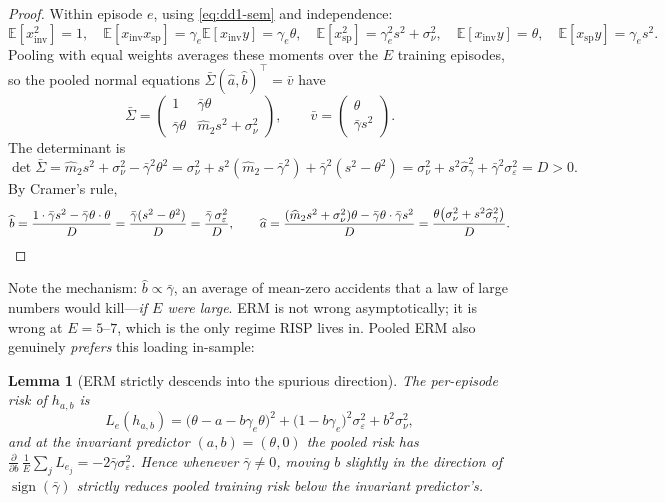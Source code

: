 \documentclass[11pt,a4paper]{article}
\theoremstyle{definition}
\theoremstyle{plain}
\newtheorem{lemma}{Lemma}[section]
\newcommand{\E}{\mathbb{E}}
\newcommand{\nm}{\textsc{RISP}}
\begin{document}
\begin{proof}
Within episode $e$, using \eqref{eq:dd1-sem} and independence:
\[
\E[x_{\mathrm{inv}}^2] = 1, \quad
\E[x_{\mathrm{inv}} x_{\mathrm{sp}}] = \gamma_e \E[x_{\mathrm{inv}} y]
= \gamma_e \theta, \quad
\E[x_{\mathrm{sp}}^2] = \gamma_e^2 s^2 + \sigma_\nu^2, \quad
\E[x_{\mathrm{inv}} y] = \theta, \quad
\E[x_{\mathrm{sp}} y] = \gamma_e s^2 .
\]
Pooling with equal weights averages these moments over the $E$ training
episodes, so the pooled normal equations
$\bar{\Sigma} (\widehat a, \widehat b)^\top = \bar v$ have
\[
\bar{\Sigma} = \begin{pmatrix} 1 & \bar{\gamma}\theta \\
\bar{\gamma}\theta & \widehat{m}_2 s^2 + \sigma_\nu^2 \end{pmatrix},
\qquad
\bar v = \begin{pmatrix} \theta \\ \bar{\gamma} s^2 \end{pmatrix}.
\]
The determinant is
\[
\det \bar{\Sigma}
= \widehat{m}_2 s^2 + \sigma_\nu^2 - \bar{\gamma}^2 \theta^2
= \sigma_\nu^2 + s^2(\widehat{m}_2 - \bar{\gamma}^2)
+ \bar{\gamma}^2 (s^2 - \theta^2)
= \sigma_\nu^2 + s^2 \widehat{\sigma}_\gamma^2
+ \bar{\gamma}^2 \sigma_\varepsilon^2 = D > 0 .
\]
By Cramer's rule,
\[
\widehat{b} = \frac{1 \cdot \bar{\gamma} s^2 - \bar{\gamma}\theta \cdot
\theta}{D} = \frac{\bar{\gamma}(s^2 - \theta^2)}{D}
= \frac{\bar{\gamma}\, \sigma_\varepsilon^2}{D},
\qquad
\widehat{a} = \frac{(\widehat{m}_2 s^2 + \sigma_\nu^2)\theta -
\bar{\gamma}\theta \cdot \bar{\gamma} s^2}{D}
= \frac{\theta\bigl( \sigma_\nu^2 + s^2 \widehat{\sigma}_\gamma^2
\bigr)}{D}. \qedhere
\]
\end{proof}

Note the mechanism: $\widehat{b} \propto \bar{\gamma}$, an average of
mean-zero accidents that a law of large numbers would kill---\emph{if $E$
were large}. ERM is not wrong asymptotically; it is wrong at $E = 5$--$7$,
which is the only regime \nm{} lives in. Pooled ERM also genuinely
\emph{prefers} this loading in-sample:

\begin{lemma}[ERM strictly descends into the spurious direction]
\label{lem:dd1-erm-descends}
The per-episode risk of $h_{a,b}$ is
\begin{equation}
\label{eq:dd1-Le}
L_e(h_{a,b})
= \bigl( \theta - a - b\gamma_e\theta \bigr)^2
+ \bigl( 1 - b\gamma_e \bigr)^2 \sigma_\varepsilon^2
+ b^2 \sigma_\nu^2,
\end{equation}
and at the invariant predictor $(a, b) = (\theta, 0)$ the pooled risk has
$\frac{\partial}{\partial b}\, \frac{1}{E}\sum_j L_{e_j} =
-2\bar{\gamma}\sigma_\varepsilon^2$. Hence whenever $\bar{\gamma} \neq 0$,
moving $b$ slightly in the direction of $\operatorname{sign}(\bar\gamma)$
strictly reduces pooled training risk below the invariant predictor's.
\end{lemma}
\end{document}
